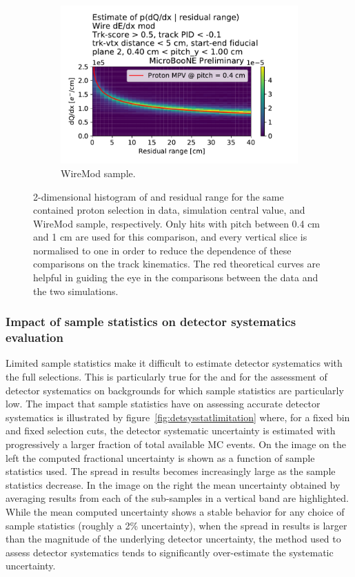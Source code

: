 \begin{figure}[H]
\begin{center}
\begin{subfigure}[b]{0.32\textwidth}
    \includegraphics[width=1.00\textwidth]{detsys/calorimetry_dqdx/bnb_nu_wire_dedx_mod_04_pitch_y_10.pdf}
    \caption{\label{fig:syst:dedx_vs_rr:wire_mod} WireMod \dedx sample.}
    \end{subfigure}
\caption{\label{fig:syst:dedx_vs_rr}2-dimensional histogram of \dqdx and residual range for the same contained proton selection in data, simulation central value, and WireMod \dedx sample, respectively.
Only hits with pitch between 0.4 cm and 1 cm are used for this comparison, and every vertical slice is normalised to one in order to reduce the dependence of these comparisons on the track kinematics.
The red theoretical curves are helpful in guiding the eye in the comparisons between the data and the two simulations.}
\end{center}
\end{figure}

\subsubsection{Impact of sample statistics on detector systematics evaluation}
\par Limited sample statistics make it difficult to estimate detector systematics with the full selections. This is particularly true for the \zpsel and for the assessment of detector systematics on backgrounds for which sample statistics are particularly low. The impact that sample statistics have on assessing accurate detector systematics is illustrated by figure~\ref{fig:detsysstatlimitation} where, for a fixed bin and fixed selection cuts, the detector systematic uncertainty is estimated with progressively a larger fraction of total available MC events. On the image on the left the computed fractional uncertainty is shown as a function of sample statistics used. The spread in results becomes increasingly large as the sample statistics decrease. In the image on the right the mean uncertainty obtained by averaging results from each of the sub-samples in a vertical band are highlighted. While the mean computed uncertainty shows a stable behavior for any choice of sample statistics (roughly a 2\% uncertainty), when the spread in results is larger than the magnitude of the underlying detector uncertainty, the method used to assess detector systematics tends to significantly over-estimate the systematic uncertainty. 

